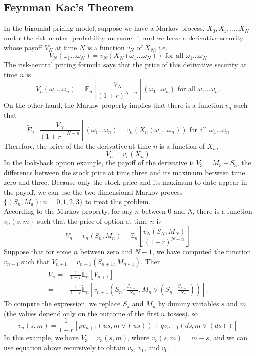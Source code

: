 \documentclass[a4paper]{article}
\begin{document}
\subsection{Feynman Kac's Theorem}
In the binomial pricing model, suppose we have a Markov process, $X_0, X_1,...,X_N$ under the risk-neutral probability measure $\tilde{\mathbb{P}}$, and we have a derivative security whose payoff $V_N$ at time $N$ is a function $v_N$ of $X_N$, i.e.
$$V_N(\omega_1...\omega_N)=v_N(X_N(\omega_1...\omega_N))\text{ for all }\omega_1...\omega_N$$
The risk-neutral pricing formula says that the price of this derivative security at time $n$ is 
$$V_n(\omega_1...\omega_n)=\tilde{\mathbb{E}}_n\left[\frac{V_N}{(1+r)^{N-n}}\right](\omega_1...\omega_n) \text{ for all }\omega_1...\omega_n.$$
On the other hand, the Markov property implies that there is a function $v_n$ such that 
$$\tilde{E}_n\left[\frac{V_N}{(1+r)^{N-n}}\right](\omega_1...\omega_n) = v_n(X_n(\omega_1...\omega_n))\text{ for all }\omega_1...\omega_n$$
Therefore, the price of the the derivative at time $n$ is a function of $X_n$, 
$$V_n=v_n(X_n)$$
In the look-back option example, the payoff of the derivative is $V_3=M_3-S_3$, the difference between the stock price at time three and its maximum between time zero and three. Because only the stock price and its maximum-to-date appear in the payoff, we can use the two-dimensional Markov process $\{(S_n,M_n);n=0,1,2,3\}$ to treat this problem. \\
According to the Markov property, for any $n$ between $0$ and $N$, there is a function $v_n(s,m)$ such that the price of option at time $n$ is
$$V_n=v_n(S_n,M_n)=\tilde{\mathbb{E}}_n\left[\frac{v_N(S_N,M_N)}{(1+r)^{N-n}}\right]$$
Suppose that for some $n$ between zero and $N-1$, we have computed the function $v_{n+1}$ such that $V_{n+1}=v_{n+1}(S_{n+1},M_{n+1})$. Then
\begin{align*}V_n =& \frac{1}{1+r}\tilde{\mathbb{E}}_n[V_{n+1}]\\
=&\frac{1}{1+r}\tilde{\mathbb{E}}_n\left[v_{n+1}\left(S_n\cdot\frac{S_{n+1}}{S_n}, M_n \vee \left(S_n\cdot\frac{S_{n+1}}{S_n}\right)\right)\right].\end{align*}
To compute the expression, we replace $S_n$ and $M_n$ by dummy variables $s$ and $m$ (the values depend only on the outcome of the first $n$ tosses), so
$$v_n(s,m) = \frac{1}{1+r}[\tilde{p}v_{n+1}(us,m\vee(us))+\tilde{q}v_{n+1}(ds,m\vee(ds))]$$
In this example, we have $V_3=v_3(s,m)$, where $v_3(s,m)=m-s$, and we can use equation above recursively to obtain $v_2$, $v_1$, and $v_0$.\\
\end{document}

